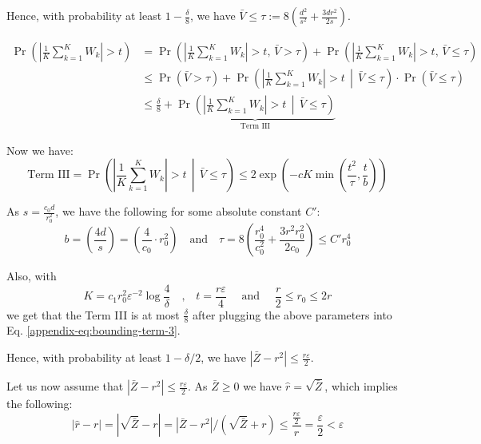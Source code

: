 
\bigskip

Hence, with probability at least $1 - \frac{\delta}{8}$, we have $
\bar{V} \leq \tau := 8 \left( \frac{d^2}{s^2} + \frac{3dr^2}{2s} \right).
$

\begin{align*}
    \Pr\left( \left| \frac{1}{K} \sum_{k=1}^{K} W_k \right| > t \right)&= \Pr\left( \left| \frac{1}{K} \sum_{k=1}^{K} W_k \right| > t ,\, \bar{V} > \tau \right) +\Pr\left( \left| \frac{1}{K} \sum_{k=1}^{K} W_k \right| > t ,\, \bar{V} \leq \tau \right)  \\
    &\leq \Pr(\bar{V} > \tau) + \Pr\left( \left| \frac{1}{K} \sum_{k=1}^{K} W_k \right| > t \,\middle|\, \bar{V} \leq \tau \right)\cdot \Pr(\bar{V} \leq \tau)\\
    &\leq \frac{\delta}{8} + \underbrace{\Pr\left( \left| \frac{1}{K} \sum_{k=1}^{K} W_k \right| > t \,\middle|\, \bar{V} \leq \tau \right)}_{\text{Term III}}
\end{align*}

Now we have:
\begin{equation}\label{appendix-eq:bounding-term-3}
    \text{Term III}=\Pr\left( \left| \frac{1}{K} \sum_{k=1}^{K} W_k \right| > t \,\middle|\, \bar{V} \leq \tau \right) 
\leq 2 \exp\left( -cK \min\left( \frac{t^2}{\tau}, \frac{t}{b} \right) \right)
\end{equation}

As $s = \frac{c_0 d}{r_0^2}$, we have the following for some absolute constant $C'$:
\[
b = \left( \frac{4d}{s} \right) = \left( \frac{4}{c_0} \cdot {r_0^2} \right)
\quad \text{and} \quad 
\tau = 8 \left( \frac{r_0^4}{c_0^2} + \frac{3r^2 r_0^2}{2c_0} \right)
\leq C' r_0^4 
\]

Also, with 
\[
K = c_1 r_0^2 \varepsilon^{-2} \log \frac{4}{\delta}
\quad \text{,} \quad 
t = \frac{r \varepsilon}{4} \quad \text{ and }\quad\frac{r}{2}\leq r_0\leq 2r
\]
we get that the Term III is at most $\frac{\delta}{8}$ after plugging the above parameters into Eq. \eqref{appendix-eq:bounding-term-3}.


Hence, with probability at least $1 - \delta/2$, we have 
$
\left| \bar{Z} - r^2 \right| \leq \frac{r \varepsilon}{2}. 
$

Let us now assume that $\left| \bar{Z} - r^2 \right| \leq \frac{r \varepsilon}{2}$. As $\bar{Z}\geq 0$ we have $\hat{r}=\sqrt{\bar{Z}}$, which implies the following:
    \[
    |\hat{r} - r| = \left| \sqrt{\bar{Z}} - r \right| 
    = \left| \bar{Z} - r^2 \right| \bigg/ \left( \sqrt{\bar{Z}} + r \right)
    \leq \frac{\frac{r \varepsilon}{2}}{r}
    = \frac{\varepsilon}{2} < \varepsilon
    \]






